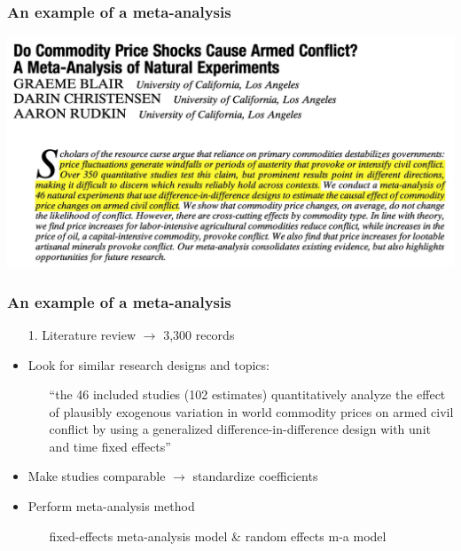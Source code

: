 \documentclass[aspectratio=43]{beamer}
\begin{document}
\begin{frame}
\frametitle{An example of a meta-analysis}
\centering

\includegraphics[width = \textwidth]{../img/blair_apsr}

\end{frame}

\begin{frame}
\frametitle{An example of a meta-analysis}
\centering

\begin{itemize}
  \item[1.] Literature review $\rightarrow$ 3,300 records
  \item<2->[2.] Look for similar research designs and topics:
  \begin{itemize}
    \item[] ``the 46 included studies (102 estimates) quantitatively analyze the effect of plausibly exogenous variation in world commodity prices on armed civil conflict by using a generalized difference-in-difference design with unit and time fixed effects''
  \end{itemize}
  \item<3->[3.] Make studies comparable $\rightarrow$ standardize coefficients
  \item<4->[4.] Perform meta-analysis method
  \begin{itemize}
    \item[] fixed-effects meta-analysis model \& random effects m-a model
  \end{itemize}
\end{itemize}

\end{frame}
\end{document}
